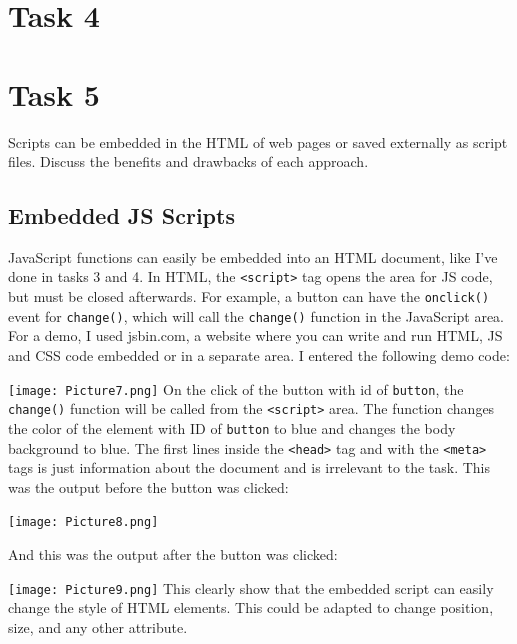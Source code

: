 \documentclass[a4paper]{article}
\begin{document}
\section{Task 4}

\section{Task 5}
Scripts can be embedded in the HTML of web pages or saved externally as script files. Discuss the benefits and drawbacks of each approach.
\subsection{Embedded JS Scripts}
JavaScript functions can easily be embedded into an HTML document, like I've done in tasks 3 and 4. In HTML, the \verb|<script>| tag opens the area for JS code, but must be closed afterwards. For example, a button can have the \verb|onclick()| event for \verb|change()|, which will call the \verb|change()| function in the JavaScript area. For a demo, I used jsbin.com, a website where you can write and run HTML, JS and CSS code embedded or in a separate area. I entered the following demo code: \par
\noindent\texttt{[image: Picture7.png]}
On the click of the button with id of \verb|button|, the \verb|change()| function will be called from the \verb|<script>| area. The function changes the color of the element with ID of \verb|button| to blue and changes the body background to blue. The first lines inside the \verb|<head>| tag and with the \verb|<meta>| tags is just information about the document and is irrelevant to the task. This was the output before the button was clicked: \par
\noindent\texttt{[image: Picture8.png]}\par \newpage
And this was the output after the button was clicked: \par
\noindent\texttt{[image: Picture9.png]}
This clearly show that the embedded script can easily change the style of HTML elements. This could be adapted to change position, size, and any other attribute. \newpage
\end{document}
